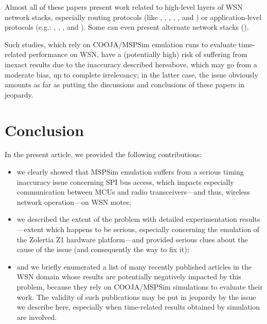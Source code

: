 \documentclass[a4paper,10pt]{article}
\begin{document}
Almost all of these papers present work related to high-level layers
of WSN network stacks, especially routing protocols (like
\cite{Constrain-Routing-Trees-2014}, \cite{Contiki-RPL-Eval-2014},
\cite{Co-RPL-2014}, \cite{IETF-Routing-WSN-2014},
\cite{RPL-GreenHouse-Convgc-Time-2014}, and \cite{Trickle-L2-2014})
or application-level protocols (e.g.: \cite{DINAS-2014},
\cite{Efficient-Distrib-Svc-Discovery-2014}, \cite{Key-Mgmt-2015},
and \cite{Visual-Sensor-Networks-2014}).
Some can even present alternate network stacks (\cite{TinySDN-2014}).

\medskip

Such studies, which rely on COOJA/MSPSim emulation runs to evaluate
time-related performance on WSN, have a (potentially high) risk of
suffering from inexact results due to the inaccuracy described hereabove,
which may go from a moderate bias, up to complete irrelevancy; in the latter
case, the issue obviously amounts as far as putting the discussions and
conclusions of these papers in jeopardy.


\section{Conclusion}

In the present article, we provided the following contributions:
\begin{itemize}
\item we clearly showed that MSPSim emulation suffers from a serious timing
inaccuracy issue concerning SPI bus access, which impacts especially
communication between MCUs and radio transceivers---and thus, wireless
network operation---on WSN motes;
\item we described the extent of the problem with detailed experimentation
results---extent which happens to be serious, especially concerning the
emulation of the Zolertia Z1 hardware platform---and provided serious clues
about the cause of the issue (and consequently the way to fix it);
\item and we briefly enumerated a list of many recently published articles
in the WSN domain whose results are potentially negatively impacted by this
problem, because they rely on COOJA/MSPSim simulations to evaluate their work.
The validity of such publications may be put in jeopardy by the
issue we describe here, especially when time-related results
obtained by simulation are involved.
\end{itemize}
\end{document}
